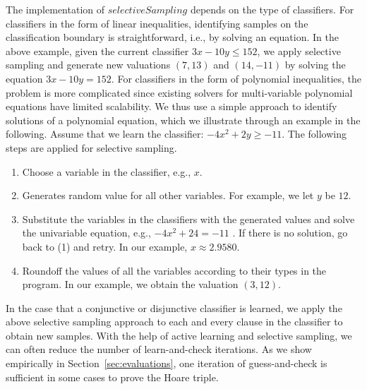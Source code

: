 The implementation of $selectiveSampling$ depends on the type of classifiers. For classifiers in the form of linear inequalities, identifying samples on the classification boundary is straightforward, i.e., by solving an equation. In the above example, given the current classifier $3x-10y \leq 152$, we apply selective sampling and generate new valuations $(7, 13)$ and $(14, -11)$ by solving the equation $3x-10y = 152$. %
For classifiers in the form of polynomial inequalities, the problem is more complicated since existing solvers for multi-variable polynomial equations have limited scalability. We thus use a simple approach to identify solutions of a polynomial equation, which we illustrate through an example in the following. Assume that we learn the classifier: $-4x^2+2y \geq -11$. The following steps are applied for selective sampling.
\begin{enumerate}
\item Choose a variable in the classifier, e.g., $x$.
\item Generates random value for all other variables. For example, we let $y$ be $12$.
\item Substitute the variables in the classifiers with the generated values and solve the univariable equation, e.g., $-4x^2+24 = -11$ . If there is no solution, go back to (1) and retry.
In our example, $x \approx 2.9580$.
\item Roundoff the values of all the variables according to their types in the program. In our example, we obtain the valuation $(3, 12)$.
\end{enumerate}
In the case that a conjunctive or disjunctive classifier is learned, we apply the above selective sampling approach to each and every clause in the classifier to obtain new samples. With the help of active learning and selective sampling, we can often reduce the number of learn-and-check iterations. As we show empirically in Section~\ref{sec:evaluations}, one iteration of guess-and-check is sufficient in some cases to prove the Hoare triple.

